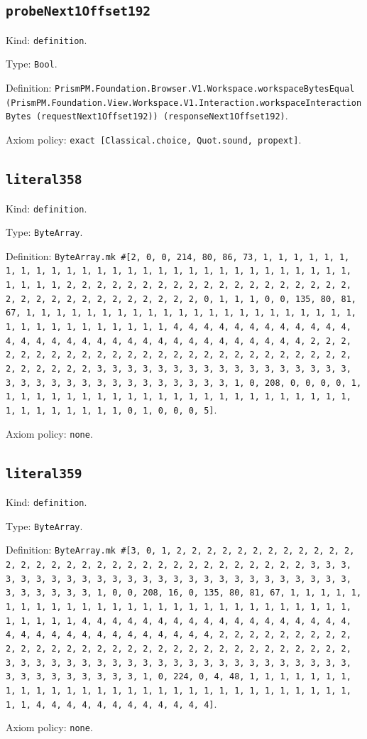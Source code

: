 \documentclass[11pt]{article}
\begin{document}
\subsection*{\texttt{probeNext1Offset192}}
\noindent Kind: \texttt{definition}.\par
\noindent Type: \texttt{Bool}.\par
\noindent Definition: \texttt{PrismPM.Foundation.Browser.V1.Workspace.workspaceBytesEqual (PrismPM.Foundation.View.Workspace.V1.Interaction.workspaceInteractionBytes (requestNext1Offset192)) (responseNext1Offset192)}.\par
\noindent Axiom policy: \texttt{exact [Classical.choice, Quot.sound, propext]}.\par
\subsection*{\texttt{literal358}}
\noindent Kind: \texttt{definition}.\par
\noindent Type: \texttt{ByteArray}.\par
\noindent Definition: \texttt{ByteArray.mk \#[2, 0, 0, 214, 80, 86, 73, 1, 1, 1, 1, 1, 1, 1, 1, 1, 1, 1, 1, 1, 1, 1, 1, 1, 1, 1, 1, 1, 1, 1, 1, 1, 1, 1, 1, 1, 1, 1, 1, 1, 2, 2, 2, 2, 2, 2, 2, 2, 2, 2, 2, 2, 2, 2, 2, 2, 2, 2, 2, 2, 2, 2, 2, 2, 2, 2, 2, 2, 2, 2, 2, 2, 0, 1, 1, 1, 0, 0, 135, 80, 81, 67, 1, 1, 1, 1, 1, 1, 1, 1, 1, 1, 1, 1, 1, 1, 1, 1, 1, 1, 1, 1, 1, 1, 1, 1, 1, 1, 1, 1, 1, 1, 1, 1, 1, 4, 4, 4, 4, 4, 4, 4, 4, 4, 4, 4, 4, 4, 4, 4, 4, 4, 4, 4, 4, 4, 4, 4, 4, 4, 4, 4, 4, 4, 4, 4, 4, 2, 2, 2, 2, 2, 2, 2, 2, 2, 2, 2, 2, 2, 2, 2, 2, 2, 2, 2, 2, 2, 2, 2, 2, 2, 2, 2, 2, 2, 2, 2, 2, 3, 3, 3, 3, 3, 3, 3, 3, 3, 3, 3, 3, 3, 3, 3, 3, 3, 3, 3, 3, 3, 3, 3, 3, 3, 3, 3, 3, 3, 3, 3, 3, 1, 0, 208, 0, 0, 0, 0, 1, 1, 1, 1, 1, 1, 1, 1, 1, 1, 1, 1, 1, 1, 1, 1, 1, 1, 1, 1, 1, 1, 1, 1, 1, 1, 1, 1, 1, 1, 1, 1, 0, 1, 0, 0, 0, 5]}.\par
\noindent Axiom policy: \texttt{none}.\par
\subsection*{\texttt{literal359}}
\noindent Kind: \texttt{definition}.\par
\noindent Type: \texttt{ByteArray}.\par
\noindent Definition: \texttt{ByteArray.mk \#[3, 0, 1, 2, 2, 2, 2, 2, 2, 2, 2, 2, 2, 2, 2, 2, 2, 2, 2, 2, 2, 2, 2, 2, 2, 2, 2, 2, 2, 2, 2, 2, 2, 2, 2, 3, 3, 3, 3, 3, 3, 3, 3, 3, 3, 3, 3, 3, 3, 3, 3, 3, 3, 3, 3, 3, 3, 3, 3, 3, 3, 3, 3, 3, 3, 3, 3, 1, 0, 0, 208, 16, 0, 135, 80, 81, 67, 1, 1, 1, 1, 1, 1, 1, 1, 1, 1, 1, 1, 1, 1, 1, 1, 1, 1, 1, 1, 1, 1, 1, 1, 1, 1, 1, 1, 1, 1, 1, 1, 1, 4, 4, 4, 4, 4, 4, 4, 4, 4, 4, 4, 4, 4, 4, 4, 4, 4, 4, 4, 4, 4, 4, 4, 4, 4, 4, 4, 4, 4, 4, 4, 4, 2, 2, 2, 2, 2, 2, 2, 2, 2, 2, 2, 2, 2, 2, 2, 2, 2, 2, 2, 2, 2, 2, 2, 2, 2, 2, 2, 2, 2, 2, 2, 2, 3, 3, 3, 3, 3, 3, 3, 3, 3, 3, 3, 3, 3, 3, 3, 3, 3, 3, 3, 3, 3, 3, 3, 3, 3, 3, 3, 3, 3, 3, 3, 3, 1, 0, 224, 0, 4, 48, 1, 1, 1, 1, 1, 1, 1, 1, 1, 1, 1, 1, 1, 1, 1, 1, 1, 1, 1, 1, 1, 1, 1, 1, 1, 1, 1, 1, 1, 1, 1, 1, 4, 4, 4, 4, 4, 4, 4, 4, 4, 4, 4, 4]}.\par
\noindent Axiom policy: \texttt{none}.\par
\end{document}

